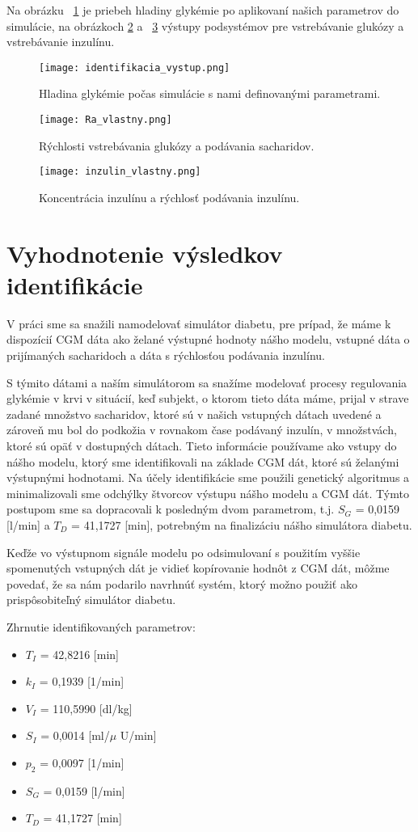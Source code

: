 \documentclass[11pt]{article} %
\begin{document}
Na obrázku ~\ref{fig:identifikacia_vystup} je priebeh hladiny glykémie po aplikovaní našich parametrov do simulácie, na obrázkoch \ref{fig:Ra_vlastny} a ~\ref{fig:inzulin_vlastny} výstupy podsystémov pre vstrebávanie glukózy a vstrebávanie inzulínu.
 

\begin{figure}[!htb]
	\centering
	\texttt{[image: identifikacia\_vystup.png]} 
	\caption{Hladina glykémie počas simulácie s nami definovanými parametrami.}
	\label{fig:identifikacia_vystup}
\end{figure}

\begin{figure}[!htb]
	\centering
	\texttt{[image: Ra\_vlastny.png]} 
	\caption{Rýchlosti vstrebávania glukózy a podávania sacharidov.}
	\label{fig:Ra_vlastny}
\end{figure}


\begin{figure}[!htb]
	\centering
	\texttt{[image: inzulin\_vlastny.png]} 
	\caption{Koncentrácia inzulínu a rýchlosť podávania inzulínu.}
	\label{fig:inzulin_vlastny}
\end{figure}


\section{Vyhodnotenie výsledkov identifikácie}
V práci sme sa snažili namodelovať simulátor diabetu, pre prípad, že máme k dispozícií CGM dáta ako želané výstupné hodnoty nášho modelu, vstupné dáta o prijímaných sacharidoch a dáta s rýchlosťou podávania inzulínu. 

S týmito dátami a naším simulátorom sa snažíme modelovať procesy regulovania glykémie v krvi v situácií, keď subjekt, o ktorom tieto dáta máme, prijal v strave zadané množstvo sacharidov, ktoré sú v našich vstupných dátach uvedené a zároveň mu bol do podkožia v rovnakom čase podávaný inzulín, v množstvách, ktoré sú opäť v dostupných dátach. Tieto informácie používame ako vstupy do nášho modelu, ktorý sme identifikovali na základe CGM dát, ktoré sú želanými výstupnými hodnotami. Na účely identifikácie sme použili genetický algoritmus a minimalizovali sme odchýlky štvorcov výstupu nášho modelu a CGM dát. Týmto postupom sme sa dopracovali k posledným dvom parametrom, t.j. $S_G$ = 0,0159 [l/min] a  $T_D$ = 41,1727 [min], potrebným na finalizáciu nášho simulátora diabetu.

Keďže vo výstupnom signále modelu po odsimulovaní s použitím vyššie spomenutých vstupných dát je vidieť kopírovanie hodnôt z CGM dát, môžme povedať, že sa nám podarilo navrhnúť systém, ktorý možno použiť ako prispôsobiteľný simulátor diabetu. 

\vspace{5mm}

Zhrnutie identifikovaných parametrov:
\begin{itemize}
\item $T_I$ = 42,8216 [min]
\item $k_I$ = 0,1939 [1/min]
\item $V_I$ = 110,5990 [dl/kg]
\item $S_I$ = 0,0014 [ml/$\mu$ U/min]
\item $p_2$ = 0,0097 [1/min]
\item $S_G$ = 0,0159 [l/min]
\item $T_D$ = 41,1727 [min]
\end{itemize}
\end{document}
